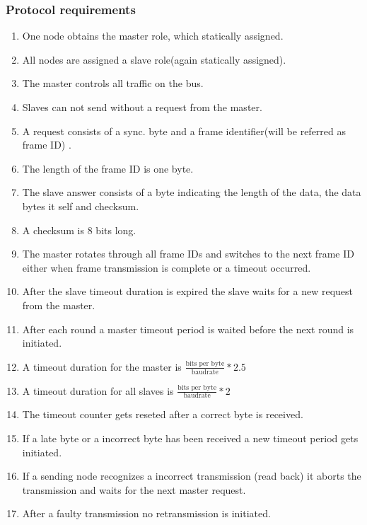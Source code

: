 \subsubsection{Protocol requirements}

\begin{enumerate}
\item {} One node obtains the master role, which statically assigned.
\item {} All nodes are assigned a slave role(again statically assigned).
\item {} The master controls all traffic on the bus.
\item {}  Slaves can not send without a request from the master.
\item {}  A request consists of a sync. byte and
a frame identifier(will be referred as frame ID) . 
\item {}  The length of the frame ID is one byte.
\item {}  The slave answer consists of a byte 
indicating the length of the data, the data bytes it self and checksum.
\item {}  A checksum is 8 bits long. %
\item {}  The master rotates through all frame IDs
and switches to the next frame ID either when frame transmission is complete or
a timeout occurred. 
\item {}  After the slave timeout duration is expired
the slave waits for a new request from the master. 
\item {}  After each round a master timeout
period is waited before the next round is initiated.
\item {}  A timeout duration for the master is
$\frac{\text{bits per byte}}{\text{baudrate}}*2.5$
\item {}  A timeout duration for all slaves is
$\frac{\text{bits per byte}}{\text{baudrate}}*2$
\item {}  The timeout counter gets reseted
after a correct byte is received.
\item  {} If a late byte or a incorrect byte has been received a new
timeout period gets initiated.
\item  {} If a sending node recognizes a incorrect transmission (read back)
it aborts the transmission and waits for the next master request.
\item {}  After a faulty transmission no 
retransmission is initiated.

\end{enumerate}
